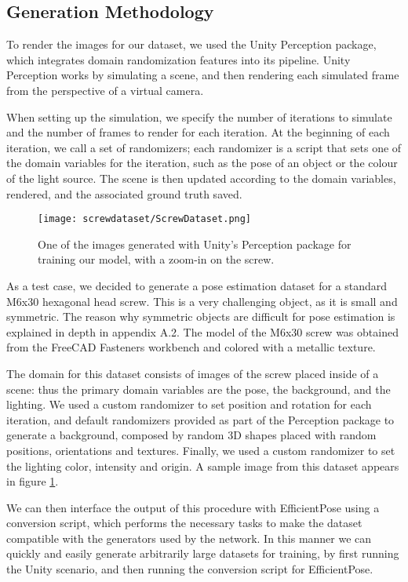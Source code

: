 \subsection{Generation Methodology}
\label{ss:ScrewDataset}

To render the images for our dataset, we used the Unity Perception package\cite{unityPerception}, which integrates domain randomization features into its pipeline. Unity Perception works by simulating a scene, and then rendering each simulated frame from the perspective of a virtual camera. 

When setting up the simulation, we specify the number of iterations to simulate and the number of frames to render for each iteration. At the beginning of each iteration, we call a set of randomizers; each randomizer is a script that sets one of the domain variables for the iteration, such as the pose of an object or the colour of the light source. The scene is then updated according to the domain variables, rendered, and the associated ground truth saved.

\begin{figure}
    \centering
    \texttt{[image: screwdataset/ScrewDataset.png]}
    \caption{One of the images generated with Unity's Perception package for training our model, with a zoom-in on the screw.}
    \label{fig:screwdataset}
\end{figure}

As a test case, we decided to generate a pose estimation dataset for a standard M6x30 hexagonal head screw. This is a very challenging object, as it is small and symmetric. The reason why symmetric objects are difficult for pose estimation is explained in depth in appendix A.2. The model of the M6x30 screw was obtained from the FreeCAD Fasteners workbench\cite{Fasteners} and colored with a metallic texture.

The domain for this dataset consists of images of the screw placed inside of a scene: thus the primary domain variables are the pose, the background, and the lighting. We used a custom randomizer to set position and rotation for each iteration, and default randomizers provided as part of the Perception package to generate a background, composed by random 3D shapes placed with random positions, orientations and textures. Finally, we used a custom randomizer to set the lighting color, intensity and origin. A sample image from this dataset appears in figure \ref{fig:screwdataset}.

We can then interface the output of this procedure with EfficientPose using a conversion script, which performs the necessary tasks to make the dataset compatible with the generators used by the network. In this manner we can quickly and easily generate arbitrarily large datasets for training, by first running the Unity scenario, and then running the conversion script for EfficientPose.


